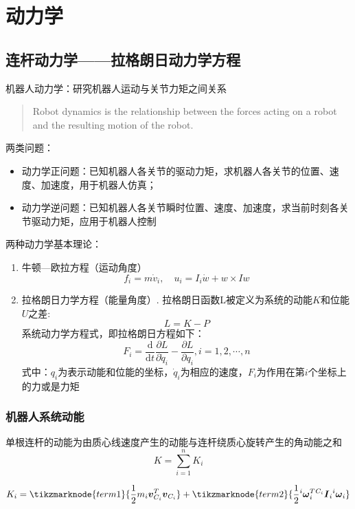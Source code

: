 \chapter{动力学}
\label{sec:04-dynamics}

\section{连杆动力学——拉格朗日动力学方程}

机器人动力学：研究机器人运动与关节力矩之间关系
\begin{quote}
    Robot dynamics is the relationship between the forces acting on a robot and the resulting motion of the robot.
\end{quote}

两类问题：
\begin{itemize}
    \item 动力学正问题：已知机器人各关节的驱动力矩，求机器人各关节的位置、速度、加速度，用于机器人仿真；
    \item 动力学逆问题：已知机器人各关节瞬时位置、速度、加速度，求当前时刻各关节驱动力矩，应用于机器人控制
\end{itemize}

两种动力学基本理论：
\begin{enumerate}
    \item 牛顿—欧拉方程（\textcolor{whusakura}{运动角度}）
        $$
        f_i = m\dot{v}_i,\quad u_i = I_i\dot{w} + w \times Iw
        $$
    \item 拉格朗日力学方程（\textcolor{whusakura}{能量角度}）.
        拉格朗日函数L被定义为系统的动能$K$和位能$U$之差:
        $$
        L = K - P
        $$
        系统动力学方程式，即拉格朗日方程如下：
        $$
        F_i = \frac{\mathrm{d}}{\mathrm{d}t}\frac{\partial L}{\partial \dot{q}_i} - \frac{\partial L}{\partial q_i}, i = 1, 2, \cdots, n
        $$
        式中：$q_i$为表示动能和位能的坐标，$\dot{q}_i$为相应的速度，$F_i$为作用在第$i$个坐标上的力或是力矩
\end{enumerate}

\subsection{机器人系统动能}
单根连杆的动能为由质心线速度产生的动能与连杆绕质心旋转产生的角动能之和
$$
K = \sum_{i=1}^n K_i
$$

$$
    K_i = 
    \tikzmarknode{term1}{\frac{1}{2} m_i \boldsymbol{v}_{C_i}^T \boldsymbol{v}_{C_i}} 
    + 
    \tikzmarknode{term2}{\frac{1}{2} {}^{i}\boldsymbol{\omega}_i^T {}^{C_i}\boldsymbol{I}_i {}^{i}\boldsymbol{\omega}_i}
$$

